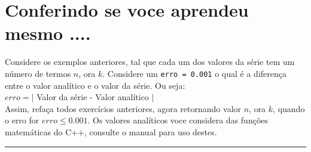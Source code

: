 \documentclass[12pt,a4paper]{article}
\begin{document}
\section{Conferindo se voce aprendeu mesmo ....}

Considere os exemplos anteriores, tal que cada um dos valores da
série tem um número de termos $n$, ora $k$. Considere um \texttt{erro = 0.001}
o qual é a diferença entre o valor analítico e o valor da série.
Ou seja:\\


 $erro = \mid$ Valor da série - Valor analítico $\mid$\\


Assim, refaça todos exercícios anteriores, agora retornando valor $n$, ora $k$,
quando o erro for $erro \le 0.001$. Os valores analíticos voce considera
das funções matemáticas do C++, consulte o manual para uso destes.




\begin{center}
\rule{15cm}{0.1cm}
\end{center}
\end{document}
